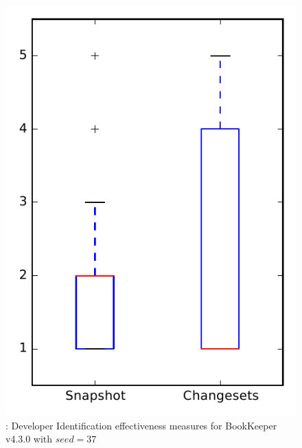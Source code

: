 
\begin{figure}
\centering
\includegraphics[height=0.4\textheight]{figures/dit_seed/rq1_bookkeeper_37}
\caption{\rtwo: Developer Identification effectiveness measures for BookKeeper v4.3.0 with $seed=37$}
\label{fig:dit_seed:rq1:bookkeeper}
\end{figure}
